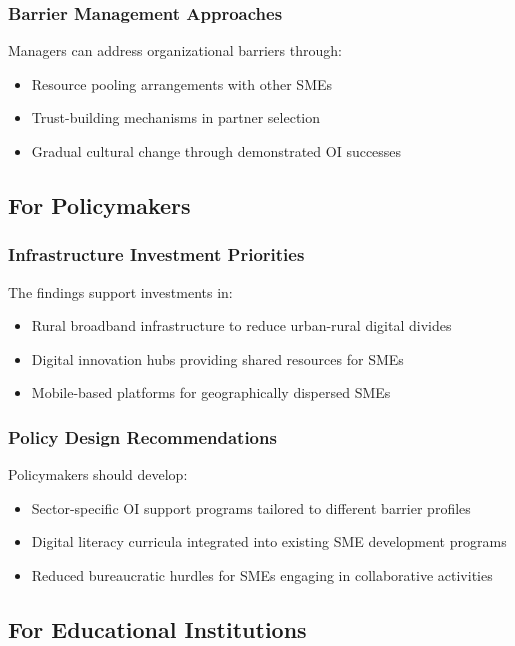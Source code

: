 \subsubsection{Barrier Management Approaches}
Managers can address organizational barriers through:
\begin{itemize}
    \item Resource pooling arrangements with other SMEs
    \item Trust-building mechanisms in partner selection
    \item Gradual cultural change through demonstrated OI successes
\end{itemize}

\subsection{For Policymakers}

\subsubsection{Infrastructure Investment Priorities}
The findings support investments in:
\begin{itemize}
    \item Rural broadband infrastructure to reduce urban-rural digital divides
    \item Digital innovation hubs providing shared resources for SMEs
    \item Mobile-based platforms for geographically dispersed SMEs
\end{itemize}

\subsubsection{Policy Design Recommendations}
Policymakers should develop:
\begin{itemize}
    \item Sector-specific OI support programs tailored to different barrier profiles
    \item Digital literacy curricula integrated into existing SME development programs
    \item Reduced bureaucratic hurdles for SMEs engaging in collaborative activities
\end{itemize}

\subsection{For Educational Institutions}


